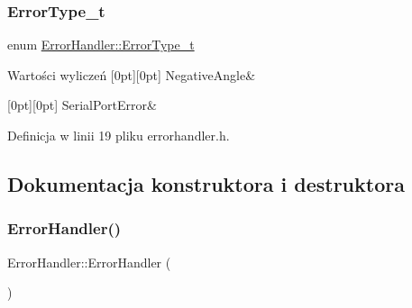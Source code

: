 \subsubsection{\texorpdfstring{Error\+Type\+\_\+t}{ErrorType\_t}}
{\footnotesize\ttfamily enum \hyperlink{class_error_handler_aee61709d471d61ec7d1069369565b59a}{Error\+Handler\+::\+Error\+Type\+\_\+t}}

\begin{DoxyEnumFields}{Wartości wyliczeń}
[0pt][0pt]{}\mbox{\label{class_error_handler_aee61709d471d61ec7d1069369565b59aa1ecd3180072ace794160f0cfcfea9458}} 
Negative\+Angle&\\
\hline

[0pt][0pt]{}\mbox{\label{class_error_handler_aee61709d471d61ec7d1069369565b59aac9084d70b57995fc2e17dd81033c08b6}} 
Serial\+Port\+Error&\\
\hline

\end{DoxyEnumFields}


Definicja w linii 19 pliku errorhandler.\+h.



\subsection{Dokumentacja konstruktora i destruktora}
\mbox{\label{class_error_handler_a7e5f379bd231442b898cef94556b2107}} 
\subsubsection{\texorpdfstring{Error\+Handler()}{ErrorHandler()}}
{\footnotesize\ttfamily Error\+Handler\+::\+Error\+Handler (\begin{DoxyParamCaption}{ }\end{DoxyParamCaption})}



